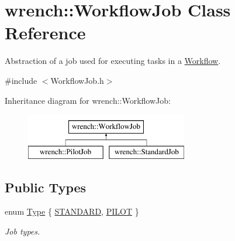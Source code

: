\hypertarget{classwrench_1_1_workflow_job}{}\section{wrench\+:\+:Workflow\+Job Class Reference}
\label{classwrench_1_1_workflow_job}


Abstraction of a job used for executing tasks in a \hyperlink{classwrench_1_1_workflow}{Workflow}.  




{\ttfamily \#include $<$Workflow\+Job.\+h$>$}

Inheritance diagram for wrench\+:\+:Workflow\+Job\+:\begin{figure}[H]
\begin{center}
\leavevmode
\includegraphics[height=2.000000cm]{classwrench_1_1_workflow_job}
\end{center}
\end{figure}
\subsection*{Public Types}
\begin{DoxyCompactItemize}
\item 
enum \hyperlink{classwrench_1_1_workflow_job_a5dcf81c50b5d221ef2a48126bf45d08b}{Type} \{ \hyperlink{classwrench_1_1_workflow_job_a5dcf81c50b5d221ef2a48126bf45d08ba12e4d89be33b16c05c2628f09e1ac0de}{S\+T\+A\+N\+D\+A\+RD}, 
\hyperlink{classwrench_1_1_workflow_job_a5dcf81c50b5d221ef2a48126bf45d08ba3eab6a0caa1eae9cbb7321a083125543}{P\+I\+L\+OT}
 \}\begin{DoxyCompactList}\small\item\em Job types. \end{DoxyCompactList}
\end{DoxyCompactItemize}
